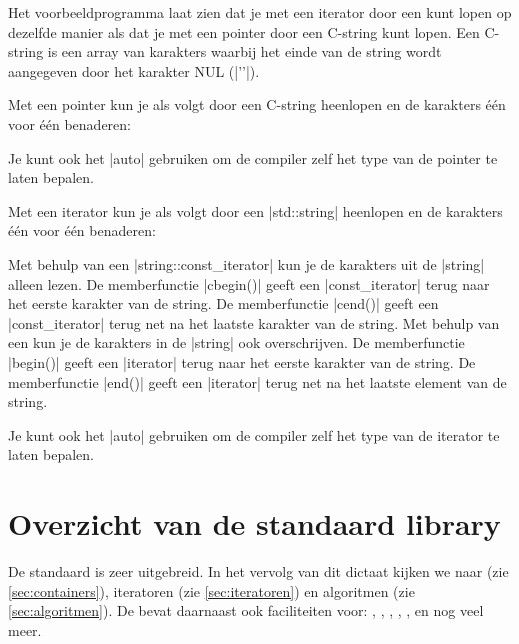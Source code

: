 \begin{cpplstShortInline}
\figuur{width=8cm}{stl}{De samenhang tussen containers, iteratoren en algoritmen.
	A = Algoritme, C = Container, i = iterator, b = begin, e = end, [ib,ie) = bereik van ib tot ie.}

\label{sec:vbstring}
Het voorbeeldprogramma  laat zien dat je met een iterator door een  kunt lopen op dezelfde manier als dat je met een pointer door een C\hyp{}string kunt lopen.
Een C\hyp{}string is een array van karakters waarbij het einde van de string wordt aangegeven door het karakter NUL (|'\0'|).

Met een pointer kun je als volgt door een C\hyp{}string heenlopen en de karakters één voor één benaderen:

Je kunt ook het  |auto| gebruiken om de compiler zelf het type van de pointer te laten bepalen.

Met een iterator kun je als volgt door een |std::string| heenlopen en de karakters één voor één benaderen:

Met behulp van een |string::const_iterator| kun je de karakters uit de |string| alleen lezen.
De memberfunctie |cbegin()| geeft een |const_iterator| terug naar het eerste karakter van de string.
De memberfunctie |cend()| geeft een |const_iterator| terug net na het laatste karakter van de string.
Met behulp van een  kun je de karakters in de |string| ook overschrijven.
De memberfunctie |begin()| geeft een |iterator| terug naar het eerste karakter van de string.
De memberfunctie |end()| geeft een |iterator| terug net na het laatste element van de string.

Je kunt ook het  |auto| gebruiken om de compiler zelf het type van de iterator te laten bepalen.

\section{Overzicht van de standaard library}
\label{sec:stdliboverview}
De standaard \Cpp{}  \cite{ISO2017} is zeer uitgebreid. 
In het vervolg van dit dictaat kijken we naar  (zie \cref{sec:containers}), iteratoren (zie \cref{sec:iteratoren}) en algoritmen (zie \cref{sec:algoritmen}).
De  bevat daarnaast ook faciliteiten voor: , , , , ,  en nog veel meer.


\end{cpplstShortInline}

